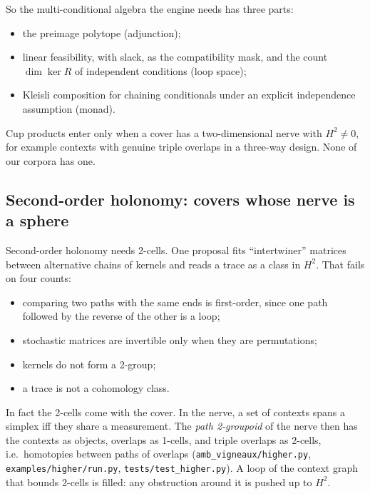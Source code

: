 \documentclass[11pt]{article}
\theoremstyle{definition}
\theoremstyle{remark}
\begin{document}
\noindent So the multi-conditional algebra the engine needs has three parts:
\begin{itemize}
  \item the preimage polytope (adjunction);
  \item linear feasibility, with slack, as the compatibility mask, and the count $\dim\ker R$ of independent conditions (loop space);
  \item Kleisli composition for chaining conditionals under an explicit independence assumption (monad).
\end{itemize}
Cup products enter only when a cover has a two-dimensional nerve with $H^2\ne0$, for example contexts with genuine triple overlaps in a three-way design. None of our corpora has one.

\subsection{Second-order holonomy: covers whose nerve is a sphere}\label{sec:higher}
Second-order holonomy needs 2-cells. One proposal fits ``intertwiner'' matrices between alternative chains of kernels and reads a trace as a class in $H^2$. That fails on four counts:
\begin{itemize}
  \item comparing two paths with the same ends is first-order, since one path followed by the reverse of the other is a loop;
  \item stochastic matrices are invertible only when they are permutations;
  \item kernels do not form a 2-group;
  \item a trace is not a cohomology class.
\end{itemize}
In fact the 2-cells come with the cover. In the nerve, a set of contexts spans a simplex iff they share a measurement. The \emph{path 2-groupoid} of the nerve then has the contexts as objects, overlaps as 1-cells, and triple overlaps as 2-cells, i.e.\ homotopies between paths of overlaps (\texttt{amb\_vigneaux/higher.py}, \texttt{examples/higher/run.py}, \texttt{tests/test\_higher.py}). A loop of the context graph that bounds 2-cells is filled: any obstruction around it is pushed up to $H^2$.
\end{document}
